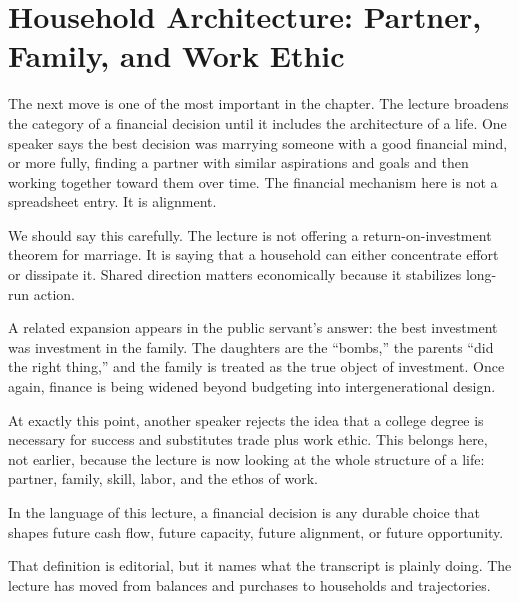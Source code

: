 \section{Household Architecture: Partner, Family, and Work Ethic}

The next move is one of the most important in the chapter. The lecture broadens the category of a financial decision until it includes the architecture of a life. One speaker says the best decision was marrying someone with a good financial mind, or more fully, finding a partner with similar aspirations and goals and then working together toward them over time. The financial mechanism here is not a spreadsheet entry. It is alignment.

We should say this carefully. The lecture is not offering a return-on-investment theorem for marriage. It is saying that a household can either concentrate effort or dissipate it. Shared direction matters economically because it stabilizes long-run action.

A related expansion appears in the public servant's answer: the best investment was investment in the family. The daughters are the ``bombs,'' the parents ``did the right thing,'' and the family is treated as the true object of investment. Once again, finance is being widened beyond budgeting into intergenerational design.

At exactly this point, another speaker rejects the idea that a college degree is necessary for success and substitutes trade plus work ethic. This belongs here, not earlier, because the lecture is now looking at the whole structure of a life: partner, family, skill, labor, and the ethos of work.

\begin{definition}
In the language of this lecture, a financial decision is any durable choice that shapes future cash flow, future capacity, future alignment, or future opportunity.
\end{definition}

That definition is editorial, but it names what the transcript is plainly doing. The lecture has moved from balances and purchases to households and trajectories.


